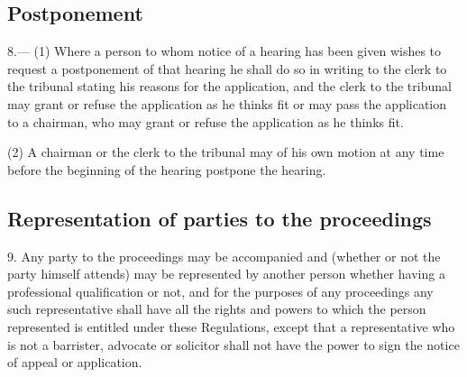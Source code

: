 \documentclass[12pt,a4paper]{article}
\begin{document}

\subsection[8. Postponement]{Postponement}

8.—%
%
(1) Where a person to whom notice of a hearing has been given wishes to request a postponement of that hearing he shall do so in writing to the clerk to the tribunal stating his reasons for the application, and the clerk to the tribunal may grant or refuse the application as he thinks fit or may pass the application to a chairman, who may grant or refuse the application as he thinks fit.

(2) A chairman 
or the clerk to the tribunal  %
may of his own motion at any time before the beginning of the hearing postpone the hearing.


\subsection[9. Representation of parties to the proceedings]{Representation of parties to the proceedings}

9.  Any party to the proceedings may be accompanied and (whether or not the party himself attends) may be represented by another person whether having a professional qualification or not, and for the purposes of any proceedings any such representative shall have all the rights and powers to which the person represented is entitled under these Regulations, except that a representative who is not a barrister, advocate or solicitor shall not have the power to sign the notice of appeal or application.
\end{document}
